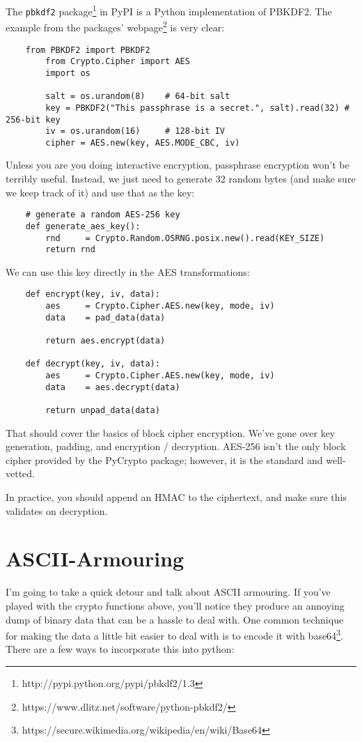 \documentclass[letterpaper,10pt]{article}
\begin{document}
The \verb|pbkdf2| package\footnote{http://pypi.python.org/pypi/pbkdf2/1.3}
in PyPI is a Python implementation of PBKDF2. The example from the packages'
webpage\footnote{https://www.dlitz.net/software/python-pbkdf2/}
is very clear:

\begin{verbatim}
    from PBKDF2 import PBKDF2
        from Crypto.Cipher import AES
        import os
    
        salt = os.urandom(8)    # 64-bit salt
        key = PBKDF2("This passphrase is a secret.", salt).read(32) # 256-bit key
        iv = os.urandom(16)     # 128-bit IV
        cipher = AES.new(key, AES.MODE_CBC, iv)
\end{verbatim}

Unless you are you doing interactive encryption, passphrase encryption won't be
terribly useful. Instead, we just need to generate 32 random bytes (and make
sure we keep track of it) and use that as the key:
\begin{verbatim}
    # generate a random AES-256 key
    def generate_aes_key():
        rnd     = Crypto.Random.OSRNG.posix.new().read(KEY_SIZE)
        return rnd
\end{verbatim}
We can use this key directly in the AES transformations:
\begin{verbatim}
    def encrypt(key, iv, data):
        aes     = Crypto.Cipher.AES.new(key, mode, iv)
        data    = pad_data(data)

        return aes.encrypt(data)

    def decrypt(key, iv, data):
        aes     = Crypto.Cipher.AES.new(key, mode, iv)
        data    = aes.decrypt(data)

        return unpad_data(data)
\end{verbatim}
That should cover the basics of block cipher encryption. We've gone over key
generation, padding, and encryption / decryption. AES-256 isn't the only 
block cipher provided by the PyCrypto package; however, it is the standard
and well-vetted. 

In practice, you should append an HMAC to the ciphertext, and make sure this
validates on decryption.

\section{ASCII-Armouring}
I'm going to take a quick detour and talk about ASCII armouring. If you've 
played with the crypto functions above, you'll notice they produce an annoying
dump of binary data that can be a hassle to deal with. One common technique for
making the data a little bit easier to deal with is to encode it with 
base64\footnote{https://secure.wikimedia.org/wikipedia/en/wiki/Base64}. There
are a few ways to incorporate this into python:
\end{document}
